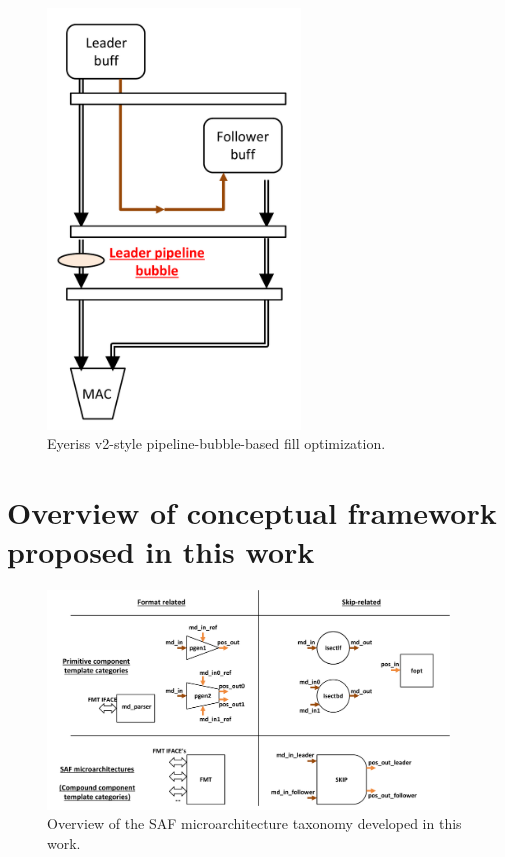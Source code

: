 \begin{figure}[ht]
    \centering
    \includegraphics[width=0.6\textwidth]{figures/pipeline_bubble.pdf}
    \caption{Eyeriss v2\cite{eyerissv2}-style pipeline-bubble-based fill optimization.}
    \label{fig:pipeline_bubble}
\end{figure}

\section{Overview of conceptual framework proposed in this work}

\begin{figure}[ht]
    \centering
    \includegraphics[width=0.95\textwidth]{figures/this_work_taxo.pdf}
    \caption{Overview of the SAF microarchitecture taxonomy developed in this work.}
    \label{fig:this_work_taxo}
\end{figure}

